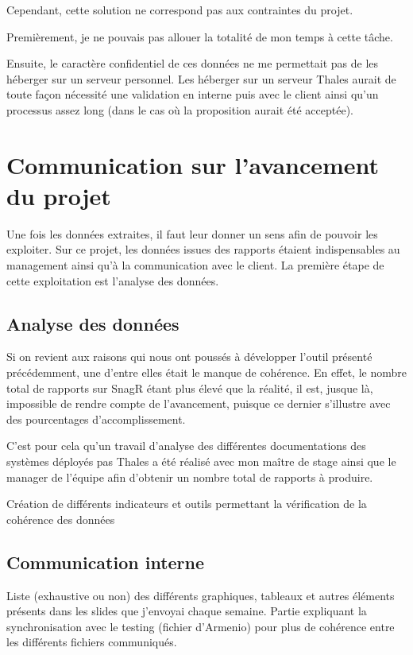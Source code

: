 Cependant, cette solution ne correspond pas aux contraintes du projet.

Premièrement, je ne pouvais pas allouer la totalité de mon temps à cette tâche.

Ensuite, le caractère confidentiel de ces données ne me permettait pas de les héberger sur un serveur personnel. Les héberger sur un serveur Thales aurait de toute façon nécessité une validation en interne puis avec le client ainsi qu'un processus assez long (dans le cas où la proposition aurait été acceptée).


\newpage
\section{Communication sur l'avancement du projet}

Une fois les données extraites, il faut leur donner un sens afin de pouvoir les exploiter. Sur ce projet, les données issues des rapports étaient indispensables au management ainsi qu'à la communication avec le client. La première étape de cette exploitation est l'analyse des données.

\subsection{Analyse des données}
Si on revient aux raisons qui nous ont poussés à développer l'outil présenté précédemment, une d'entre elles était le manque de cohérence.
En effet, le nombre total de rapports sur \gls{SnagR} étant plus élevé que la réalité, il est, jusque là, impossible de rendre compte de l'avancement, puisque ce dernier s'illustre avec des pourcentages d'accomplissement.

C'est pour cela qu'un travail d'analyse des différentes documentations des systèmes déployés pas Thales a été réalisé avec mon maître de stage ainsi que le manager de l'équipe afin d'obtenir un nombre total de rapports à produire.

Création de différents indicateurs et outils permettant la vérification de la cohérence des données



\subsection{Communication interne}
Liste (exhaustive ou non) des différents graphiques, tableaux et autres éléments présents dans les slides que j'envoyai chaque semaine.
Partie expliquant la synchronisation avec le testing (fichier d'Armenio) pour plus de cohérence entre les différents fichiers communiqués.

